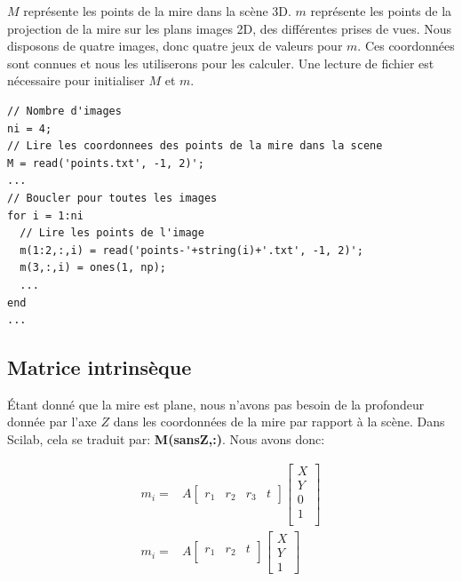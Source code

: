 \documentclass[a4paper,11pt]{article}
\begin{document}
$M$ représente les points de la mire dans la scène 3D. $m$ représente les points de la 
projection de la mire sur les plans images 2D, des différentes prises de vues. Nous disposons 
de quatre images, donc quatre 
jeux de valeurs pour $m$. Ces coordonnées sont connues et nous les utiliserons pour les 
calculer. Une lecture de fichier est nécessaire pour initialiser $M$ et $m$.\\


\begin{lstlisting}[caption=Lecture de fichier pour retrouver M et m]
// Nombre d'images
ni = 4;
// Lire les coordonnees des points de la mire dans la scene
M = read('points.txt', -1, 2)';
...
// Boucler pour toutes les images
for i = 1:ni
  // Lire les points de l'image
  m(1:2,:,i) = read('points-'+string(i)+'.txt', -1, 2)';
  m(3,:,i) = ones(1, np);
  ...
end
...
\end{lstlisting}


\subsection{Matrice intrinsèque}

Étant donné que la mire est plane, nous n'avons pas besoin de la profondeur donnée par 
l'axe $Z$ dans les coordonnées de la mire par rapport à la scène. Dans Scilab, cela se 
traduit par: \textbf{M(sansZ,:)}. Nous avons donc: 

\begin{equation}
  \begin{aligned}
    m_i=&A
    \begin{bmatrix}
    r_1 & r_2 & r_3 & t 
    \end{bmatrix}
    \begin{bmatrix}
    X \\ Y \\ 0 \\ 1\\ 
    \end{bmatrix}\\
    m_i=&A
    \begin{bmatrix}
    r_1 & r_2 & t\\
    \end{bmatrix}
    \begin{bmatrix}
    X \\ Y \\ 1
    \end{bmatrix}
  \end{aligned}
\end{equation}
\end{document}
